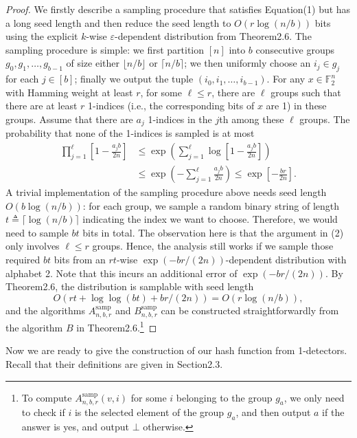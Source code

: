 \begin{proof}
We firstly describe a sampling procedure that satisfies Equation(1) but has a long seed length and then reduce the seed length to $O(r\log(n/b))$ bits using the explicit $k$-wise $\varepsilon$-dependent distribution from Theorem2.6. The sampling procedure is simple: we first partition $[n]$ into $b$ consecutive groups $g_0,g_1,\ldots,g_{b-1}$ of size either $\lfloor n/b\rfloor$ or $\lceil n/b\rceil$; we then uniformly choose an $i_j\in g_j$ for each $j\in[b]$; finally we output the tuple $(i_0,i_1,\ldots,i_{b-1})$.
For any $x\in\mathbb F_2^n$ with Hamming weight at least $r$, for some $\ell\le r$, there are $\ell$ groups such that there are at least $r$ 1-indices (i.e., the corresponding bits of $x$ are 1) in these groups. Assume that there are $a_j$ 1-indices in the $j$th among these $\ell$ groups. The probability that none of the 1-indices is sampled is at most
\begin{equation}\tag{2}
\begin{aligned}
\prod_{j=1}^\ell\left[1-\frac{a_jb}{2n}\right]
&\le\exp\left(\sum_{j=1}^\ell\log\left[1-\frac{a_jb}{2n}\right]\right)\\
&\le\exp\left(-\sum_{j=1}^\ell\frac{a_jb}{2n}\right)\le\exp\left[-\frac{br}{2n}\right].
\end{aligned}
\end{equation}
A trivial implementation of the sampling procedure above needs seed length $O(b\log(n/b))$: for each group, we sample a random binary string of length $t\triangleq\lceil\log(n/b)\rceil$ indicating the index we want to choose. Therefore, we would need to sample $bt$ bits in total. The observation here is that the argument in (2) only involves $\ell\le r$ groups. Hence, the analysis still works if we sample those required $bt$ bits from an $rt$-wise $\exp(-br/(2n))$-dependent distribution with alphabet 2. Note that this incurs an additional error of $\exp(-br/(2n))$.
By Theorem2.6, the distribution is samplable with seed length
\[O(rt+\log\log(bt)+br/(2n))=O(r\log(n/b)),\]
and the algorithms $A^{\mathrm{samp}}_{n,b,r}$ and $B^{\mathrm{samp}}_{n,b,r}$ can be constructed straightforwardly from the algorithm $B$ in Theorem2.6.\footnote{To compute $A^{\mathrm{samp}}_{n,b,r}(v,i)$ for some $i$ belonging to the group $g_a$, we only need to check if $i$ is the selected element of the group $g_a$, and then output $a$ if the answer is yes, and output $\bot$ otherwise.}
\end{proof}
Now we are ready to give the construction of our hash function from 1-detectors. Recall that their definitions are given in Section2.3.
